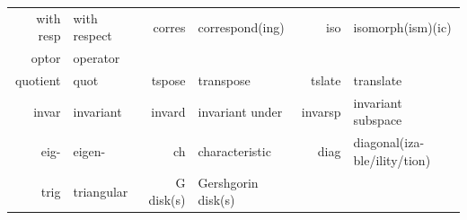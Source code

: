 {\begin{center}
\begin{tabularx}{1.00\textwidth}{
		  r |
		| >{\raggedright\arraybackslash}X | r |
		| >{\raggedright\arraybackslash}X | r |
		| >{\raggedright\arraybackslash}X }
with resp&		with respect				& corres&		correspond(ing)				& iso&			isomorph(ism)(ic)\\
optor&			operator\\
quotient&		quot						& tspose&		transpose					& tslate&		translate\\
invar&			invariant					& invard&		invariant under				& invarsp&		invariant subspace\\
eig-&			eigen-						& ch&			characteristic				& diag&			diagonal(iza-ble/ility/tion)\\
trig&			triangular					& G disk(s)&	Gershgorin disk(s)			& &\\
\hline
\end{tabularx}
\end{center}

\clearpage
}{}

\begin{large}




\end{large}


